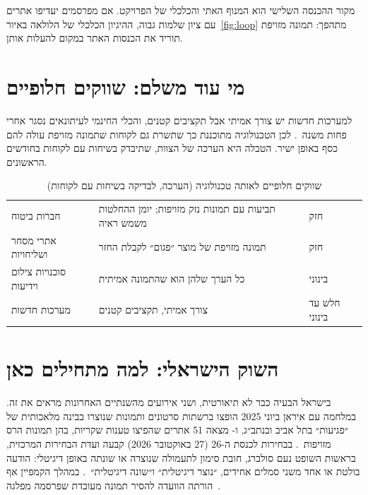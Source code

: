 מקור ההכנסה השלישי הוא המנוף האתי והכלכלי של הפרויקט. אם מפרסמים יעדיפו אתרים עם ציון שלמות גבוה, ההיגיון הכלכלי של הלולאה באיור~\ref{fig:loop} מתהפך: תמונה מזויפת תוריד את הכנסות האתר במקום להעלות אותן.

\section{מי עוד משלם: שווקים חלופיים}
למערכות חדשות יש צורך אמיתי אבל תקציבים קטנים, והכלי החינמי לעיתונאים  נסגר אחרי פחות משנה~\cite{truemedia2025}. לכן הטכנולוגיה מתוכננת כך שתשרת גם לקוחות שתמונה מזויפת עולה להם כסף באופן ישיר. הטבלה היא הערכה של הצוות, שתיבדק בשיחות עם לקוחות בחודשים הראשונים.

\begin{table}[!htb]\centering
\caption{שווקים חלופיים לאותה טכנולוגיה (הערכה, לבדיקה בשיחות עם לקוחות)}\label{tab:altmarkets}
\small
\begin{tabularx}{\linewidth}{@{}l Y l@{}}
\toprule
{} &  &  \\
\midrule
חברות ביטוח & תביעות עם תמונות נזק מזויפות; יומן ההחלטות משמש ראיה & חזק \\
אתרי מסחר ושליחויות & תמונה מזויפת של מוצר ״פגום״ לקבלת החזר & חזק \\
סוכנויות צילום וידיעות & כל הערך שלהן הוא שהתמונה אמיתית & בינוני \\
מערכות חדשות & צורך אמיתי, תקציבים קטנים & חלש עד בינוני \\
\bottomrule
\end{tabularx}
\end{table}

\section{השוק הישראלי: למה מתחילים כאן}\label{sec:israel}
בישראל הבעיה כבר לא תיאורטית, ושני אירועים מהשנתיים האחרונות מראים את זה. במלחמה עם איראן ביוני \num{2025} הופצו ברשתות סרטונים ותמונות שנוצרו בבינה מלאכותית של ״פגיעות״ בתל אביב ובנתב״ג, ו- מצאה \num{51} אתרים שהפיצו טענות שקריות, בהן תמונות הרס מזויפות~\cite{afp2025}. בבחירות לכנסת ה-\num{26} (\num{27} באוקטובר \num{2026}) קבעה ועדת הבחירות המרכזית, בראשות השופט נעם סולברג, חובת סימון לתעמולה שנוצרה או שונתה באופן דיגיטלי: הודעה בולטת או אחד משני סמלים אחידים, ״נוצר דיגיטלית״ ו״שונה דיגיטלית״~\cite{pearlcohen2026,toi2026}. במהלך הקמפיין אף הורתה הוועדה להסיר תמונה מעובדת שפרסמה מפלגה~\cite{toi2026}.

